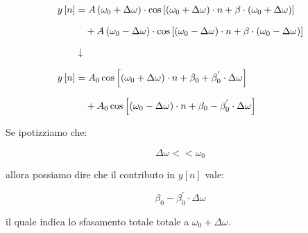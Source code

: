 {
    \Large 
    \begin{equation}
        \setlength{\jot}{10pt} %
        \begin{split}
        y \left[ n\right] 
        &= 
        A \left(\omega_0 + \Delta \omega\right) 
        \cdot 
        \cos 
        \left[
            \left(
                \omega_0 + \Delta \omega
            \right)
            \cdot 
            n
            + 
            \beta 
            \cdot 
            \left(
                \omega_0 + \Delta \omega
            \right)
        \right]
        \\
        &\quad
        +A \left(\omega_0 - \Delta \omega\right) 
        \cdot 
        \cos 
        \left[
            \left(
                \omega_0 - \Delta \omega
            \right)
            \cdot 
            n
            + 
            \beta 
            \cdot 
            \left(
                \omega_0 - \Delta \omega
            \right)
        \right]
        \\
        &\downarrow
        \\
        y \left[ n\right]  
        &=  
        A_0
        \cos 
        \left[ 
        \left(\omega_0 + \Delta \omega\right) 
        \cdot
        n 
        + 
        \beta_0 
        + 
        \beta_0^{'}
        \cdot 
        \Delta \omega
        \right] 
        \\
        &\quad
        + 
        A_0
        \cos 
        \left[ 
        \left(\omega_0 - \Delta \omega\right) 
        \cdot
        n 
        + 
        \beta_0 
        - 
        \beta_0^{'}
        \cdot 
        \Delta \omega
        \right] 
        \end{split}
        \end{equation}
} 

Se ipotizziamo che: 

{
    \Large 
    \begin{equation}
        \Delta \omega 
        << 
        \omega_0
    \end{equation}
}

allora possiamo dire che il contributo in $y \left[ n\right]$ vale: 

{
    \Large 
    \begin{equation}
        \beta_0 
        - 
        \beta_0^{'}
        \cdot 
        \Delta \omega
    \end{equation}
}

il quale indica lo sfasamento totale totale a $\omega_0 + \Delta \omega$. \newline 

